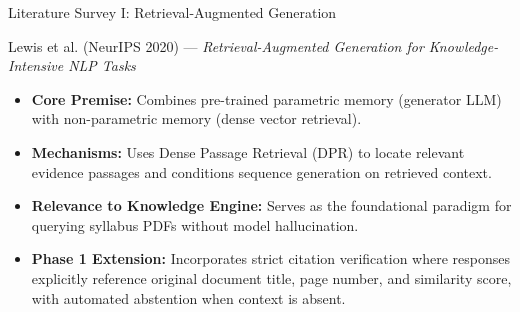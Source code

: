 \documentclass[aspectratio=169,10pt]{beamer}
\begin{document}
\begin{frame}{Literature Survey I: Retrieval-Augmented Generation}
  \begin{block}{Lewis et al. (NeurIPS 2020) --- \textit{Retrieval-Augmented Generation for Knowledge-Intensive NLP Tasks}}
    \begin{itemize}
      \item \textbf{Core Premise:} Combines pre-trained parametric memory (generator LLM) with non-parametric memory (dense vector retrieval).
      \item \textbf{Mechanisms:} Uses Dense Passage Retrieval (DPR) to locate relevant evidence passages and conditions sequence generation on retrieved context.
      \item \textbf{Relevance to Knowledge Engine:} Serves as the foundational paradigm for querying syllabus PDFs without model hallucination.
      \item \textbf{Phase 1 Extension:} Incorporates strict citation verification where responses explicitly reference original document title, page number, and similarity score, with automated abstention when context is absent.
    \end{itemize}
  \end{block}
\end{frame}
\end{document}
